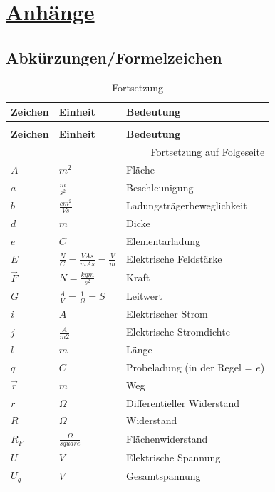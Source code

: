\documentclass[12pt,a4paper]{article}%
\numberwithin{equation}{section}
\begin{document}
\section{\underline{Anhänge}}
\subsection{Abkürzungen/Formelzeichen}
\renewcommand{\arraystretch}{1.5}

\begin{longtable} {|p{2cm}|p{3cm}|p{9cm}|} \hline
\textbf{Zeichen} & \textbf{Einheit} & \textbf{Bedeutung} \\
\hline
\endfirsthead %
\caption{Fortsetzung}\\ \hline
\textbf{Zeichen} & \textbf{Einheit} & \textbf{Bedeutung} \\
\hline
\endhead %
\multicolumn{3}{r}{Fortsetzung auf Folgeseite}\\
\endfoot
\hline
\endlastfoot

$A$ & $m^2$ & Fläche \\ \hline
$a$ & $\frac{m}{s^2}$ & Beschleunigung \\ \hline
$b$ & $\frac{cm^2}{Vs}$ & Ladungsträgerbeweglichkeit \\ \hline
$d$ & $m$ & Dicke \\ \hline
$e$ & $C$ & Elementarladung \\ \hline
$E$ & $\frac{N}{C} = \frac{VAs}{mAs} = \frac{V}{m}$ & Elektrische Feldstärke \\ \hline
$\vec{F}$ & $N = \frac{kgm}{s^2}$ & Kraft \\ \hline
$G$ & $\frac{A}{V} = \frac{1}{\Omega} = S$ & Leitwert \\ \hline

$i$ & $A$ & Elektrischer Strom \\ \hline
$j$ & $\frac{A}{m2}$ & Elektrische Stromdichte \\ \hline
$l$ & $m$ & Länge \\ \hline

$q$ & $C$ & Probeladung (in der Regel = $e$) \\ \hline
$\vec{r}$ & $m$ & Weg \\ \hline
$r$ & $\Omega$ & Differentieller Widerstand \\ \hline
$R$ & $\Omega$ & Widerstand \\ \hline
$R_F$ & $\frac{\Omega}{square}$ & Flächenwiderstand \\ \hline 
$U$ & $V$ & Elektrische Spannung \\ \hline
$U_g$ & $V$ & Gesamtspannung \\ \hline
 

\end{longtable}
\end{document}
